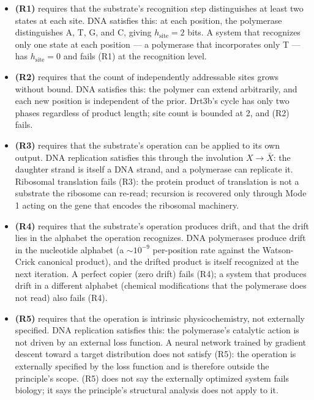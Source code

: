 \documentclass[aps,prx,reprint,amsmath,amssymb,floatfix,superscriptaddress,nofootinbib]{revtex4-2}
\theoremstyle{plain-thm}
\theoremstyle{definition-thm}
\begin{document}
\begin{itemize}
\item \textbf{(R1)} requires that the substrate's recognition step distinguishes at least two states at each site. DNA satisfies this: at each position, the polymerase distinguishes A, T, G, and C, giving $h_{\mathrm{site}} = 2$ bits. A system that recognizes only one state at each position --- a polymerase that incorporates only T --- has $h_{\mathrm{site}} = 0$ and fails (R1) at the recognition level.
\item \textbf{(R2)} requires that the count of independently addressable sites grows without bound. DNA satisfies this: the polymer can extend arbitrarily, and each new position is independent of the prior. Drt3b's cycle has only two phases regardless of product length; site count is bounded at 2, and (R2) fails.
\item \textbf{(R3)} requires that the substrate's operation can be applied to its own output. DNA replication satisfies this through the involution $X \to \bar{X}$: the daughter strand is itself a DNA strand, and a polymerase can replicate it. Ribosomal translation fails (R3): the protein product of translation is not a substrate the ribosome can re-read; recursion is recovered only through Mode 1 acting on the gene that encodes the ribosomal machinery.
\item \textbf{(R4)} requires that the substrate's operation produces drift, and that the drift lies in the alphabet the operation recognizes. DNA polymerases produce drift in the nucleotide alphabet (a $\sim 10^{-9}$ per-position rate against the Watson-Crick canonical product), and the drifted product is itself recognized at the next iteration. A perfect copier (zero drift) fails (R4); a system that produces drift in a different alphabet (chemical modifications that the polymerase does not read) also fails (R4).
\item \textbf{(R5)} requires that the operation is intrinsic physicochemistry, not externally specified. DNA replication satisfies this: the polymerase's catalytic action is not driven by an external loss function. A neural network trained by gradient descent toward a target distribution does not satisfy (R5): the operation is externally specified by the loss function and is therefore outside the principle's scope. (R5) does not say the externally optimized system fails biology; it says the principle's structural analysis does not apply to it.
\end{itemize}
\end{document}

